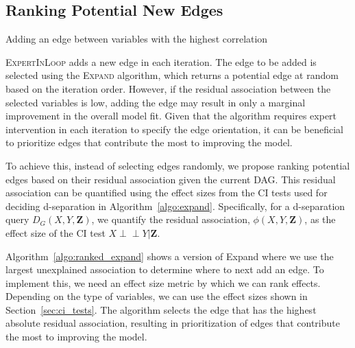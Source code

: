 \documentclass[accepted]{uai2025} %
\def\ci{\perp\!\!\!\!\perp}
\begin{document}
\subsection{Ranking Potential New Edges}
\label{sec:ranking}

\begin{algorithm}[h]
\DontPrintSemicolon
\SetAlgoLined
{}
\caption{Adding an edge between variables with the highest correlation}
\label{algo:ranked_expand}
\end{algorithm}

\textsc{ExpertInLoop} adds a new edge in each iteration. The edge
to be added is selected using the \textsc{Expand} algorithm, which 
returns a potential edge at random based on the iteration order. 
However, if the residual association between the selected variables 
is low, adding the edge may result in only a marginal improvement 
in the overall model fit. Given that the
algorithm requires expert intervention in each iteration to specify the edge
orientation, it can be beneficial to prioritize edges that contribute 
the most to improving the model.

To achieve this, instead of selecting edges randomly, we propose ranking
potential edges based on their residual association given the current DAG. This
residual association can be quantified using the effect sizes from the
CI tests used for deciding d-separation in Algorithm~\ref{algo:expand}.
Specifically, for a d-separation query $D_G(X, Y, \mathbf{Z}) $, we quantify
the residual association, $ \phi(X, Y, \bm{Z}) $, as the effect size of the CI
test $X \ci Y \rvert \bm{Z} $. 

Algorithm~\ref{algo:ranked_expand} shows a 
version of {\sc Expand} where we use the largest unexplained association to
determine where to next add an edge. 
To implement this, we need an effect size
metric by which we can rank effects. Depending on the type of variables, 
we can use the effect sizes shown in Section~\ref{sec:ci_tests}. 
The algorithm selects the edge that has the highest absolute residual 
association, resulting
in prioritization of edges that contribute the most to improving the model.
\end{document}
